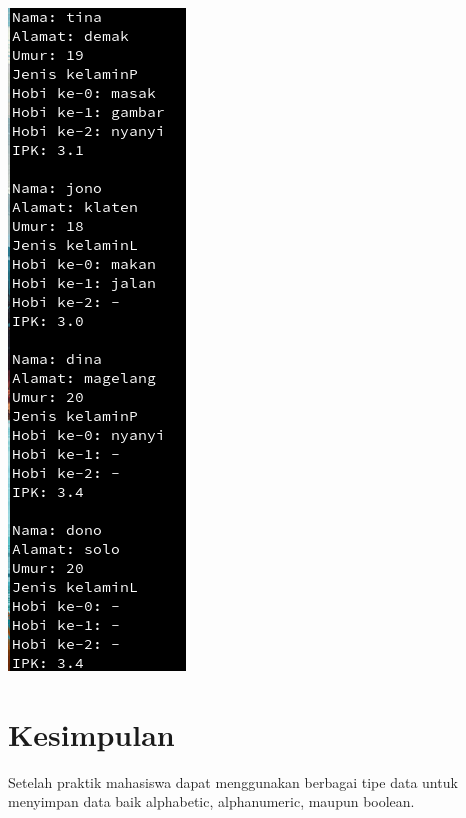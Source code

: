 \documentclass[a4paper,12pt]{article}
\begin{document}
\begin{center}
    \includegraphics[scale=1]{tugas03.png} 
\end{center}

\newpage

\section{Kesimpulan}
Setelah praktik mahasiswa dapat menggunakan berbagai tipe data untuk menyimpan data baik alphabetic, alphanumeric,
maupun boolean.
\end{document}
